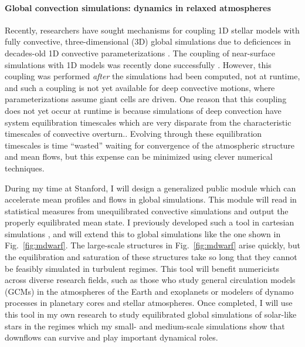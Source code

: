 \documentclass[aps, pre, onecolumn, nofootinbib, notitlepage, groupedaddress, amsfonts, amssymb, amsmath]{revtex4-1}
\begin{document}
\paragraph*{Global convection simulations: dynamics in relaxed atmospheres}
Recently, researchers have sought mechanisms for coupling 1D stellar models with fully convective, three-dimensional (3D) global simulations due to deficiences in decades-old 1D convective parameterizations \citep{bohm-vitense1958}.
The coupling of near-surface simulations with 1D models was recently done successfully \citep{jorgensen&weiss2019}.
However, this coupling was performed \emph{after} the simulations had been computed, not at runtime, and such a coupling is not yet available for deep convective motions, where parameterizations assume giant cells are driven.
One reason that this coupling does not yet occur at runtime is because simulations of deep convection have system equilibration timescales which are very disparate from the characteristic timescales of convective overturn..
Evolving through these equilibration timescales is time ``wasted'' waiting for convergence of the atmospheric structure and mean flows, but this expense can be minimized using clever numerical techniques.

During my time at Stanford, I will design a generalized public module which can accelerate mean profiles and flows in global simulations.
This module will read in statistical measures from unequilibrated convective simulations and output the properly equilibrated mean state.
I previously developed such a tool in cartesian simulations \citep{anders&all2018}, and will extend this to global simulations like the one shown in Fig.~\ref{fig:mdwarf}.
The large-scale structures in Fig.~\ref{fig:mdwarf} arise quickly, but the equilibration and saturation of these structures take so long that they cannot be feasibly simulated in turbulent regimes.
This tool will benefit numericists across diverse research fields, such as those who study general circulation models (GCMs) in the atmospheres of the Earth and exoplanets or modelers of dynamo processes in planetary cores and stellar atmospheres.
Once completed, I will use this tool in my own research to study equilibrated global simulations of solar-like stars in the regimes which my small- and medium-scale simulations show that downflows can survive and play important dynamical roles.


\vspace{-15pt}
\end{document}
